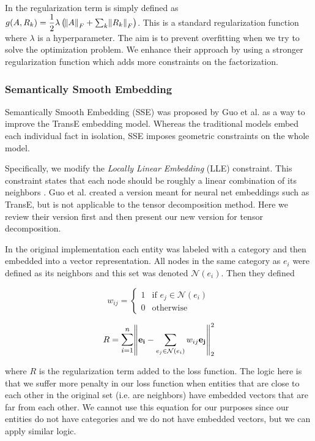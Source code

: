 \documentclass[pageno]{final_paper}
\begin{document}
In \cite{Nickel2011}\cite{Chang2014} the regularization term is simply defined
as $g(A, R_k) = \dfrac{1}{2}\lambda \left(\norm{A}_F + \sum_k \norm{R_k}_F\right)$. This is
a standard regularization function where $\lambda$ is a hyperparameter. The aim
is to prevent overfitting when we try to solve the optimization problem. We
enhance their approach by using a stronger regularization function which adds
more constraints on the factorization.

\subsubsection{Semantically Smooth Embedding}
\label{Semantically Smooth Embedding}

Semantically Smooth Embedding (SSE) was proposed by Guo et al. \cite{Guo2015} as
a way to improve the TransE \cite{Bordes2013} embedding model. Whereas the
traditional models embed each individual fact in isolation, SSE imposes
geometric constraints on the whole model.

Specifically, we modify the \textit{Locally Linear Embedding} (LLE) constraint.
This constraint states that each node should be roughly a linear combination of
its neighbors \cite{Roweis2000}. Guo et al. \cite{Guo2015} created a version
meant for neural net embeddings such as TransE, but is not applicable to the
tensor decomposition method. Here we review their version first and then present
our new version for tensor decomposition.

In the original implementation each entity was labeled with a category and
then embedded into a vector representation. All nodes in the same category as
$e_i$ were defined as its neighbors and this set was denoted $\mathcal{N}(e_i)$.
Then they defined

$$
w_{ij} =
\begin{cases}
    1 & \text{if } e_j \in \mathcal{N}(e_i) \\
    0 & \text{otherwise}
\end{cases}
$$

$$R = \mathlarger{\sum_{i=1}^n} \norm{\mathbf{e_i} - \sum_{e_j \in \mathcal{N}(e_i)} w_{ij}
\mathbf{e_j}}_2^2$$

where $R$ is the regularization term added to the loss function. The logic here
is that we suffer more penalty in our loss function when entities that are close
to each other in the original set (i.e. are neighbors) have embedded vectors
that are far from each other. We cannot use this equation for our purposes since
our entities do not have categories and we do not have embedded vectors, but we
can apply similar logic.
\end{document}
